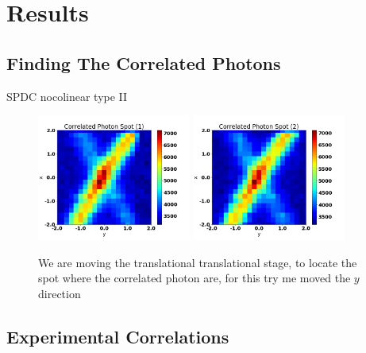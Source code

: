 
\chapter{Results} %

\label{Chapter4} %

\section{Finding The Correlated Photons}

SPDC nocolinear type II
\begin{figure}[h!]
\centering
{  \includegraphics[width=0.45\textwidth]{Figures/correlatedPhotonSpot1.png} }
{  \includegraphics[width=0.45\textwidth]{Figures/correlatedPhotonSpot2.png} }
\caption{We are moving the translational translational stage, to locate the spot where the correlated photon are, for this try me moved the $y$ direction}
 \label{fig:correlatedPhotonSpot}
\end{figure}


\section{Experimental Correlations }

